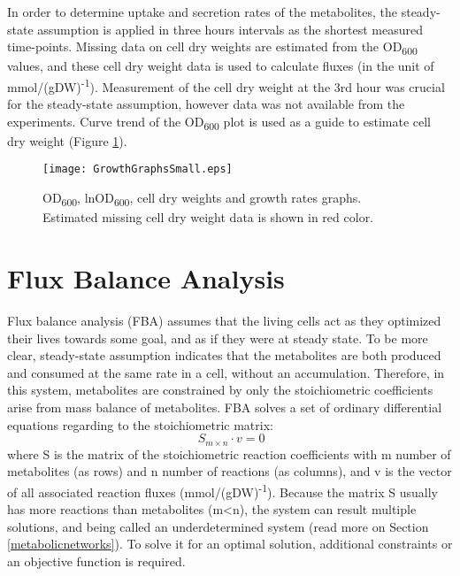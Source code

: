 In order to determine uptake and secretion rates of the metabolites, the steady-state assumption is applied in three hours intervals as the shortest measured time-points. Missing data on cell dry weights are estimated from the OD\textsubscript{600} values, and these cell dry weight data is used to calculate fluxes (in the unit of mmol/(gDW)\textsuperscript{-1}). Measurement of the cell dry weight at the 3rd hour was crucial for the steady-state assumption, however data was not available from the experiments. Curve trend of the OD\textsubscript{600} plot is used as a guide to estimate cell dry weight (Figure \ref{fig:GrowthGraphs}).
\begin{figure}[H]
  \begin{center}
  \texttt{[image: GrowthGraphsSmall.eps]}
  \end{center}
  \caption[OD\textsubscript{600}, lnOD\textsubscript{600}, cell dry weights and growth rates]{OD\textsubscript{600}, lnOD\textsubscript{600}, cell dry weights and growth rates graphs. Estimated missing cell dry weight data is shown in red color.}
\label{fig:GrowthGraphs}
\end{figure}



\section{Flux Balance Analysis}
Flux balance analysis (FBA) assumes that the living cells act as they optimized their lives towards some goal, and as if they were at steady state. To be more clear, steady-state assumption indicates that the metabolites are both produced and consumed at the same rate in a cell, without an accumulation. Therefore, in this system, metabolites are constrained by only the stoichiometric coefficients arise from mass balance of metabolites. FBA solves a set of ordinary differential equations regarding to the stoichiometric matrix:
\begin{equation}
 \ S_{m \times n} \cdot v=0
\end{equation}
\noindent where S is the matrix of the stoichiometric reaction coefficients with m number of metabolites (as rows) and n number of reactions (as columns), and v is the vector of all associated reaction fluxes (mmol/(gDW)\textsuperscript{-1}). Because the matrix S usually has more reactions than metabolites (m<n), the system can result multiple solutions, and being called an underdetermined system (read more on Section \ref{metabolicnetworks}). To solve it for an optimal solution, additional constraints or an objective function is required.

